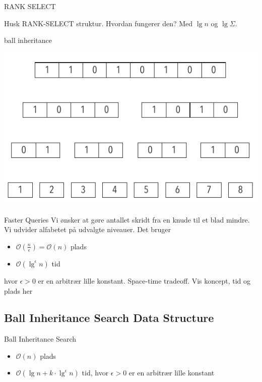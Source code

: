 \documentclass[pdf]{beamer}
\begin{document}
\begin{frame}{RANK SELECT}

  Husk RANK-SELECT struktur. Hvordan fungerer den? Med $\lg n$ og $\lg \Sigma$.

\end{frame}


\begin{frame}{ball inheritance}
  \begin{center}
    \includegraphics[scale=1.0]{pictures/uden_bolde.pdf}
  \end{center}
\end{frame}



\begin{frame}{Faster Queries}
  Vi ønsker at gøre antallet skridt fra en knude til et blad mindre. Vi udvider alfabetet på udvalgte niveauer.
  Det bruger
  \begin{itemize}
    \item $\mathcal{O}(\frac{n}{\epsilon}) = \mathcal{O}(n)$ plads
    \item $\mathcal{O}(\lg^\epsilon n)$ tid
  \end{itemize}
  hvor $\epsilon > 0$ er en arbitrær lille konstant. Space-time tradeoff.
  Vis koncept, tid og plads her
\end{frame}

\subsection{Ball Inheritance Search Data Structure}
\begin{frame}{Ball Inheritance Search}
  \begin{itemize}
    \item $\mathcal{O}(n)$ plads
    \item $\mathcal{O}(\lg n + k\cdot\lg^\epsilon n)$ tid, hvor $\epsilon > 0$ er en arbitrær lille konstant
  \end{itemize}
\end{frame}
\end{document}
